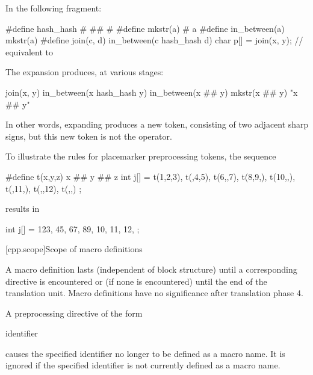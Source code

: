 \documentclass{wg21}
\newcommand{\clb}[1]{\removed{#1} \added{\grammarterm{line-break}}}
\begin{document}
\pnum
\begin{example}
    In the following fragment:
    
    \begin{codeblock}
        #define hash_hash # ## #
        #define mkstr(a) # a
        #define in_between(a) mkstr(a)
        #define join(c, d) in_between(c hash_hash d)
        char p[] = join(x, y);          // equivalent to 
    \end{codeblock}
    
    The expansion produces, at various stages:
    
    \begin{codeblock}
        join(x, y)
        in_between(x hash_hash y)
        in_between(x ## y)
        mkstr(x ## y)
        "x ## y"
    \end{codeblock}
    
    In other words, expanding  produces a new token,
    consisting of two adjacent sharp signs, but this new token is not the
    \tcode{\#\#} operator.
\end{example}

\pnum
\begin{example}
    To illustrate the rules for placemarker preprocessing tokens, the sequence
    \begin{codeblock}
        #define t(x,y,z) x ## y ## z
        int j[] = { t(1,2,3), t(,4,5), t(6,,7), t(8,9,),
            t(10,,), t(,11,), t(,,12), t(,,) };
    \end{codeblock}
    results in
    \begin{codeblock}
        int j[] = { 123, 45, 67, 89,
            10, 11, 12, };
    \end{codeblock}
\end{example}

[cpp.scope]{Scope of macro definitions}%
%

\pnum
A macro definition lasts
(independent of block structure)
until a corresponding
directive is encountered or
(if none is encountered)
until the end of the translation unit.
Macro definitions have no significance after translation phase 4.

\pnum
A preprocessing directive of the form
\begin{ncsimplebnf}
     identifier \clb{new-line}
\end{ncsimplebnf}
causes the specified identifier no longer to be defined as a macro name.
It is ignored if the specified identifier is not currently defined as
a macro name.
\end{document}
